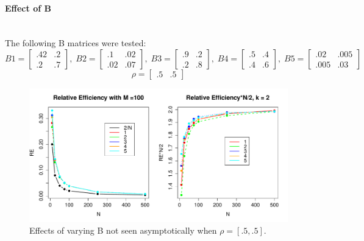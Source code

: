 \documentclass[10pt]{article}
\begin{document}
\paragraph{Effect of B}\mbox{}\\
The following B matrices were tested:
\begin{equation*}
B1 = \begin{bmatrix}
.42 & .2 \\
.2 & .7 
\end{bmatrix},\;
B2 = \begin{bmatrix}
.1 & .02 \\
.02 & .07 
\end{bmatrix},\;
B3 = \begin{bmatrix}
.9 & .2 \\
.2 & .8 
\end{bmatrix},\;
B4 = \begin{bmatrix}
.5 & .4 \\
.4 & .6 
\end{bmatrix},\;
B5 = \begin{bmatrix}
.02 & .005 \\
.005 & .03 
\end{bmatrix}
\end{equation*}
\begin{equation*}
\rho = \begin{bmatrix}
.5 & .5
\end{bmatrix}
\end{equation*}
\begin{figure}[!htb]
	\centering
	\includegraphics[width=18cm]{RPlot08.pdf}
	\caption{Effects of varying B not seen asymptotically when $\rho = [.5, .5]$.}
	\label{fig:plot1}
\end{figure}
\newpage
\end{document}
